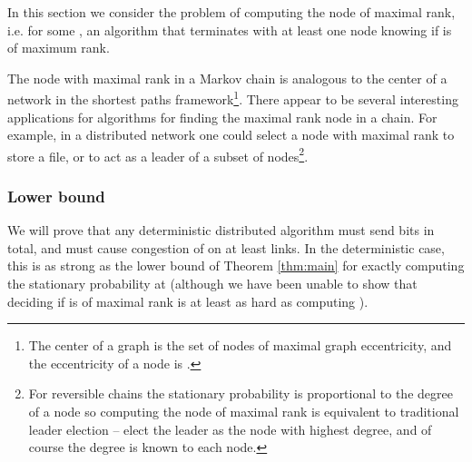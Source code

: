 \documentclass[twocolumn]{article}
\begin{document}
In this section we consider the problem of computing the node of maximal rank, i.e. for some , an algorithm that terminates with at least one node  knowing if  is of maximum rank.



The node with maximal rank in a Markov chain is analogous to the center of a network in the shortest paths framework\footnote{The center of a graph  is the set of nodes of maximal graph eccentricity, and the eccentricity of a node  is .}. There appear to be several interesting applications for algorithms for finding the maximal rank node in a chain. For example, in a distributed network one could select a node with maximal rank to store a file, or to act as a leader of a subset of nodes\footnote{For reversible chains the stationary probability is proportional to the degree of a node so computing the node of maximal rank is equivalent to traditional leader election -- elect the leader as the node with highest degree, and of course the degree is known to each node.}.

\subsubsection{Lower bound}
We will prove that any deterministic distributed algorithm must send  bits in total, and must cause congestion of  on at least  links. In the deterministic case, this is as strong as the lower bound of Theorem \ref{thm:main} for exactly computing the stationary probability at  (although we have been unable to show that deciding if  is of maximal rank is at least as hard as computing ).
\end{document}
